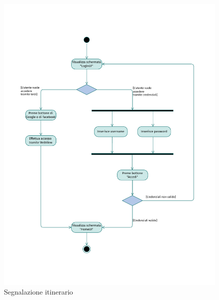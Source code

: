 \documentclass{natourDoc}
\begin{document}
\newpage
\begin{figure}[!htbp]
	\centering
	\includegraphics[width=\textwidth, page=12]{./diagrams/activity.pdf}
	\caption{Segnalazione itinerario}
\end{figure}
\FloatBarrier

\newpage
\end{document}
